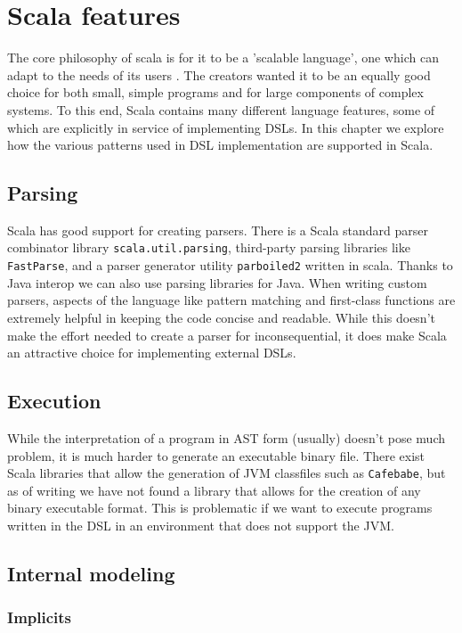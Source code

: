 \chapter{Scala features}
The core philosophy of scala is for it to be a 'scalable language', one which can adapt to the needs of its users \autocite{Odersky:2004}. The creators wanted it to be an equally good choice for both small, simple programs and for large components of complex systems. To this end, Scala contains many different language features, some of which are explicitly in service of implementing DSLs. In this chapter we explore how the various patterns used in DSL implementation are supported in Scala.

\section{Parsing}

Scala has good support for creating parsers. There is a Scala standard parser combinator library \texttt{scala.util.parsing}, third-party parsing libraries like \texttt{FastParse}, and a parser generator utility \texttt{parboiled2} written in scala. Thanks to Java interop we can also use parsing libraries for Java. When writing custom parsers, aspects of the language like pattern matching and first-class functions are extremely helpful in keeping the code concise and readable. While this doesn't make the effort needed to create a parser for inconsequential, it does make Scala an attractive choice for implementing external DSLs.

\section{Execution}

While the interpretation of a program in AST form  (usually) doesn't pose much problem, it is much harder to generate an executable binary file. There exist Scala libraries that allow the generation of JVM classfiles such as \texttt{Cafebabe}, but as of writing we have not found a library that allows for the creation of any binary executable format. This is problematic if we want to execute programs written in the DSL in an environment that does not support the JVM.

\section{Internal modeling}

\subsection{Implicits}

